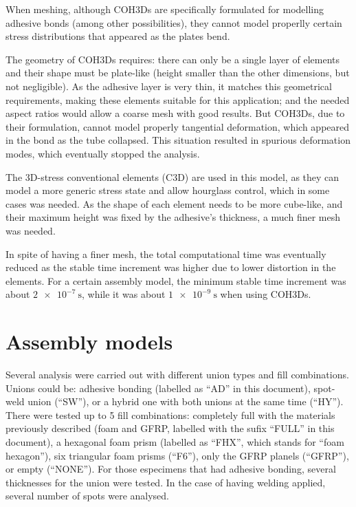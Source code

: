 
When meshing, although \glspl{COH3D} are specifically formulated for modelling adhesive bonds (among other possibilities), they cannot model properlly certain stress distributions that appeared as the plates bend.

The geometry of \glspl{COH3D} requires: there can only be a single layer of elements and their shape must be plate-like (height smaller than the other dimensions, but not negligible). As the adhesive layer is very thin, it matches this geometrical requirements, making these elements suitable for this application; and the needed aspect ratios would allow a coarse mesh with good results. But \glspl{COH3D}, due to their formulation, cannot model properly tangential deformation, which appeared in the bond as the tube collapsed. This situation resulted in spurious deformation modes, which eventually stopped the analysis.

The 3D-stress conventional elements (C3D) are used in this model, as they can model a more generic stress state%
 and allow hourglass control, which in some cases was needed. As the shape of each element needs to be more cube-like, and their maximum height was fixed by the adhesive's thickness, a much finer mesh was needed.

In spite of having a finer mesh, the total computational time was eventually reduced as the stable time increment was higher due to lower distortion in the elements. For a certain assembly model, the minimum stable time increment was about $\SI{2e-7}{\s}$, while it was about $\SI{1e-9}{\s}$ when using \glspl{COH3D}.

\section{Assembly models} %
Several analysis were carried out with different union types and fill combinations. Unions could be: adhesive bonding (labelled as ``AD'' in this document), spot-weld union (``SW''), or a hybrid one with both unions at the same time (``HY''). There were tested up to 5 fill combinations: completely full with the materials previously described (foam and GFRP, labelled with the sufix ``FULL'' in this document), a hexagonal foam prism (labelled as ``FHX'', which stands for ``foam hexagon''), six triangular foam prisms (``F6''), only the GFRP planels (``GFRP''), or empty (``NONE''). For those especimens that had adhesive bonding, several thicknesses for the union were tested. In the case of having welding applied, several number of spots were analysed.
